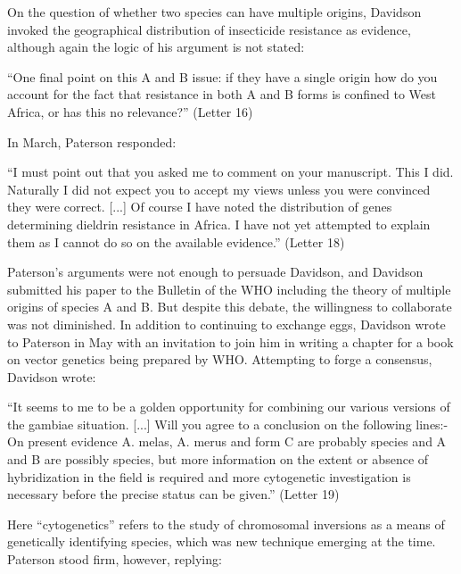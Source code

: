 \documentclass[a4paper,11pt,abstracton,hidelinks]{scrartcl}
\begin{document}
On the question of whether two species can have multiple origins, Davidson invoked the geographical distribution of insecticide resistance as evidence, although again the logic of his argument is not stated:

\begin{displayquote}
``One final point on this A and B issue: if they have a single origin how do you account for the fact that resistance in both A and B forms is confined to West Africa, or has this no relevance?'' (Letter 16)
\end{displayquote}


In March, Paterson responded:


\begin{displayquote}
``I must point out that you asked me to comment on your manuscript. This I did. Naturally I did not expect you to accept my views unless you were convinced they were correct. [...] Of course I have noted the distribution of genes determining dieldrin resistance in Africa. I have not yet attempted to explain them as I cannot do so on the available evidence.'' (Letter 18)
\end{displayquote}


Paterson's arguments were not enough to persuade Davidson, and Davidson submitted his paper to the Bulletin of the WHO including the theory of multiple origins of species A and B. But despite this debate, the willingness to collaborate was not diminished. In addition to continuing to exchange eggs, Davidson wrote to Paterson in May with an invitation to join him in writing a chapter for a book on vector genetics being prepared by WHO. Attempting to forge a consensus, Davidson wrote:


\begin{displayquote}
``It seems to me to be a golden opportunity for combining our various versions of the gambiae situation. [...] Will you agree to a conclusion on the following lines:- On present evidence A. melas, A. merus and form C are probably species and A and B are possibly species, but more information on the extent or absence of hybridization in the field is required and more cytogenetic investigation is necessary before the precise status can be given.'' (Letter 19)
\end{displayquote}


Here ``cytogenetics'' refers to the study of chromosomal inversions as a means of genetically identifying species, which was new technique emerging at the time. Paterson stood firm, however, replying:
\end{document}
